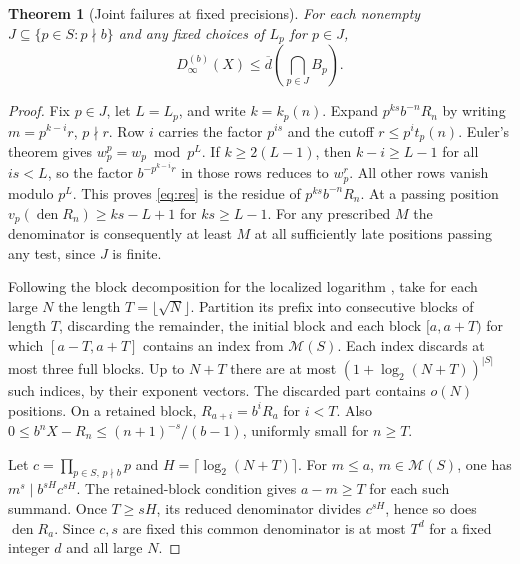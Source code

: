 \documentclass[11pt]{article}
\newtheorem{theorem}{Theorem}
\DeclareMathOperator{\den}{den}
\begin{document}
\begin{theorem}[Joint failures at fixed precisions]\label{thm:joint}
For each nonempty \(J\subseteq\{p\in S:p\nmid b\}\) and any fixed choices of \(L_p\) for \(p\in J\),
\begin{equation}\label{eq:joint}
 D_\infty^{(b)}(X)\le \overline d\left(\bigcap_{p\in J}B_p\right).
\end{equation}
\end{theorem}
\begin{proof}
Fix \(p\in J\), let \(L=L_p\), and write \(k=k_p(n)\). Expand \(p^{ks}b^{-n}R_n\) by writing \(m=p^{k-i}r\), \(p\nmid r\). Row \(i\) carries the factor \(p^{is}\) and the cutoff \(r\le p^it_p(n)\). Euler's theorem gives \(w_p^p=w_p\bmod p^L\). If \(k\ge2(L-1)\), then \(k-i\ge L-1\) for all \(is<L\), so the factor \(b^{-p^{k-i}r}\) in those rows reduces to \(w_p^r\). All other rows vanish modulo \(p^L\). This proves \eqref{eq:res} is the residue of \(p^{ks}b^{-n}R_n\). At a passing position \(v_p(\den R_n)\ge ks-L+1\) for \(ks\ge L-1\). For any prescribed \(M\) the denominator is consequently at least \(M\) at all sufficiently late positions passing any test, since \(J\) is finite.

Following the block decomposition for the localized logarithm \cite[\S5]{localized}, take for each large \(N\) the length \(T=\lfloor\sqrt N\rfloor\). Partition its prefix into consecutive blocks of length \(T\), discarding the remainder, the initial block and each block \([a,a+T)\) for which \([a-T,a+T]\) contains an index from \(\mathcal M(S)\). Each index discards at most three full blocks. Up to \(N+T\) there are at most \((1+\log_2(N+T))^{|S|}\) such indices, by their exponent vectors. The discarded part contains \(o(N)\) positions. On a retained block,
\(R_{a+i}=b^iR_a\) for \(i<T\). Also \(0\le b^nX-R_n\le(n+1)^{-s}/(b-1)\), uniformly small for \(n\ge T\).

Let \(c=\prod_{p\in S,\,p\nmid b}p\) and \(H=\lceil\log_2(N+T)\rceil\). For \(m\le a\), \(m\in\mathcal M(S)\), one has \(m^s\mid b^{sH}c^{sH}\). The retained-block condition gives \(a-m\ge T\) for each such summand. Once \(T\ge sH\), its reduced denominator divides \(c^{sH}\), hence so does \(\den R_a\). Since \(c,s\) are fixed this common denominator is at most \(T^d\) for a fixed integer \(d\) and all large \(N\).


\end{proof}
\end{document}
